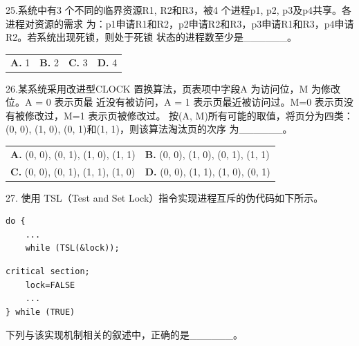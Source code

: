 \documentclass[UTF8,11pt]{ctexart}
\begin{document}
25.系统中有3 个不同的临界资源R1, R2和R3，被4 个进程p1, p2, p3及p4共享。各进程对资源的需求 为：p1申请R1和R2，p2申请R2和R3，p3申请R1和R3，p4申请R2。若系统出现死锁，则处于死锁 状态的进程数至少是\_\_\_\_\_\_。


\begin{center}\begin{tabular}{>{\raggedright\arraybackslash}p{\dimexpr(\linewidth-8\tabcolsep)/4\relax}>{\raggedright\arraybackslash}p{\dimexpr(\linewidth-8\tabcolsep)/4\relax}>{\raggedright\arraybackslash}p{\dimexpr(\linewidth-8\tabcolsep)/4\relax}>{\raggedright\arraybackslash}p{\dimexpr(\linewidth-8\tabcolsep)/4\relax}}
\textbf{A.} 1 & \textbf{B.} 2 & \textbf{C.} 3 & \textbf{D.} 4\\[.35em]\end{tabular}\end{center}

26.某系统采用改进型CLOCK 置换算法，页表项中字段A 为访问位，M 为修改位。A = 0 表示页最 近没有被访问，A = 1 表示页最近被访问过。M=0 表示页没有被修改过，M=1 表示页被修改过。 按(A, M)所有可能的取值，将页分为四类：(0, 0), (1, 0), (0, 1)和(1, 1)，则该算法淘汰页的次序 为\_\_\_\_\_\_。


\begin{center}\begin{tabular}{>{\raggedright\arraybackslash}p{\dimexpr(\linewidth-4\tabcolsep)/2\relax}>{\raggedright\arraybackslash}p{\dimexpr(\linewidth-4\tabcolsep)/2\relax}}
\textbf{A.} (0, 0), (0, 1), (1, 0), (1, 1) & \textbf{B.} (0, 0), (1, 0), (0, 1), (1, 1)\\[.35em]
\textbf{C.} (0, 0), (0, 1), (1, 1), (1, 0) & \textbf{D.} (0, 0), (1, 1), (1, 0), (0, 1)\\[.35em]\end{tabular}\end{center}

27. 使用 TSL（Test and Set Lock）指令实现进程互斥的伪代码如下所示。


\begin{Verbatim}[breaklines,breakanywhere,fontsize=\small]
do {
    ...
    while (TSL(&lock));
\end{Verbatim}

\begin{Verbatim}[breaklines,breakanywhere,fontsize=\small]
    critical section;
    lock=FALSE
    ...
} while (TRUE)
\end{Verbatim}

下列与该实现机制相关的叙述中，正确的是\_\_\_\_\_\_。
\end{document}
